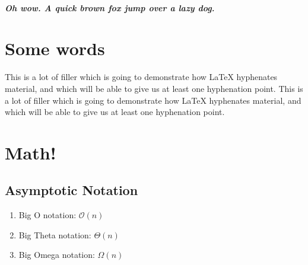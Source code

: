 \documentclass[a4paper]{article}
\begin{document}
\subparagraph{
  Oh wow. A quick brown fox jump over a lazy dog.
}

\section{Some words}

This is a lot of filler which is going to demonstrate how LaTeX hyphenates
material, and which will be able to give us at least one hyphenation point.
This is a lot of filler which is going to demonstrate how LaTeX hyphenates
material, and which will be able to give us at least one hyphenation point.

\section{Math!}

\subsection{Asymptotic Notation}

\begin{enumerate}
  \item Big O notation: $\mathcal{O}(n)$
  \item Big Theta notation: $\Theta(n)$
  \item Big Omega notation: $\Omega(n)$
\end{enumerate}
\end{document}
